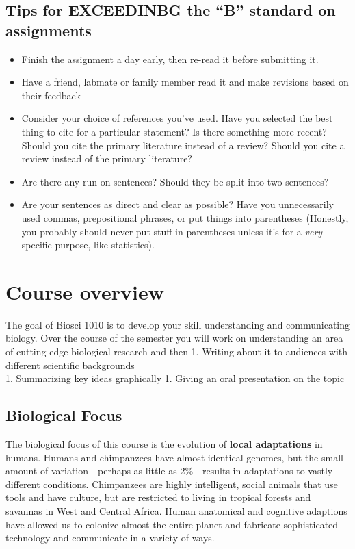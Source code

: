 \documentclass[
]{book}
\providecommand{\tightlist}{%
  \setlength{\itemsep}{0pt}\setlength{\parskip}{0pt}}
\begin{document}
\hypertarget{tips-for-exceedinbg-the-b-standard-on-assignments}{%
\section{Tips for EXCEEDINBG the ``B'' standard on assignments}\label{tips-for-exceedinbg-the-b-standard-on-assignments}}

\begin{itemize}
\tightlist
\item
  Finish the assignment a day early, then re-read it before submitting it.
\item
  Have a friend, labmate or family member read it and make revisions based on their feedback
\item
  Consider your choice of references you've used. Have you selected the best thing to cite for a particular statement? Is there something more recent? Should you cite the primary literature instead of a review? Should you cite a review instead of the primary literature?
\item
  Are there any run-on sentences? Should they be split into two sentences?
\item
  Are your sentences as direct and clear as possible? Have you unnecessarily used commas, prepositional phrases, or put things into parentheses (Honestly, you probably should never put stuff in parentheses unless it's for a \emph{very} specific purpose, like statistics).
\end{itemize}

\hypertarget{course-overview}{%
\chapter{Course overview}\label{course-overview}}

The goal of Biosci 1010 is to develop your skill understanding and communicating biology. Over the course of the semester you will work on understanding an area of cutting-edge biological research and then
1. Writing about it to audiences with different scientific backgrounds\\
1. Summarizing key ideas graphically
1. Giving an oral presentation on the topic

\hypertarget{biological-focus}{%
\section{Biological Focus}\label{biological-focus}}

The biological focus of this course is the evolution of \textbf{local adaptations} in humans. Humans and chimpanzees have almost identical genomes, but the small amount of variation - perhaps as little as 2\% - results in adaptations to vastly different conditions. Chimpanzees are highly intelligent, social animals that use tools and have culture, but are restricted to living in tropical forests and savannas in West and Central Africa. Human anatomical and cognitive adaptions have allowed us to colonize almost the entire planet and fabricate sophisticated technology and communicate in a variety of ways.
\end{document}
